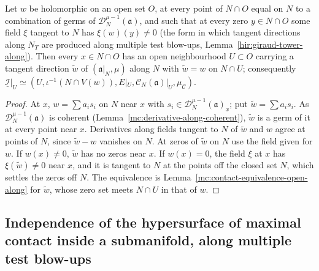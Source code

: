 \begin{lemma}
\label{mc:tangent-direction-along-restricted}
\leanok
Let \(w\) be holomorphic on an open set \(O\), at every point of \(N\cap O\) equal on \(N\) to a combination of germs of \(\mathcal D_N^{\mu-1}(\mathfrak a)\), and such that
at every zero \(y\in N\cap O\) some field \(\xi\) tangent to \(N\) has \(\xi(w)(y)\ne0\) (the form in which tangent directions along \(N_T\) are produced along
multiple test blow-ups, Lemma~\ref{hir:giraud-tower-along}). Then every \(x\in N\cap O\) has an open neighbourhood \(U\subset O\) carrying a tangent direction
\(\tilde w\) of \((\mathfrak a|_N,\mu)\) along \(N\) with \(\tilde w=w\) on \(N\cap U\); consequently
\(\underline{\mathcal I}|_U\simeq(U,\iota^{-1}(N\cap V(w)),E|_U,\mathcal C_N(\mathfrak a)|_U,\mu_{\mathcal C})\).
\end{lemma}
\begin{proof}
\leanok
At \(x\), \(w=\sum a_is_i\) on \(N\) near \(x\) with \(s_i\in\mathcal D_N^{\mu-1}(\mathfrak a)_x\); put \(\tilde w=\sum a_is_i\). As \(\mathcal D_N^{\mu-1}(\mathfrak a)\) is coherent
(Lemma~\ref{mc:derivative-along-coherent}), \(\tilde w\) is a germ of it at every point near \(x\). Derivatives along fields tangent to \(N\) of \(\tilde w\) and \(w\) agree at
points of \(N\), since \(\tilde w-w\) vanishes on \(N\). At zeros of \(\tilde w\) on \(N\) use the field given for \(w\). If \(w(x)\ne0\), \(\tilde w\) has no zeros near \(x\). If
\(w(x)=0\), the field \(\xi\) at \(x\) has \(\xi(\tilde w)\ne0\) near \(x\), and it is tangent to \(N\) at the points off the closed set \(N\), which settles the zeros off \(N\).
The equivalence is Lemma~\ref{mc:contact-equivalence-open-along} for \(\tilde w\), whose zero set meets \(N\cap U\) in that of \(w\).
\end{proof}

\subsection{Independence of the hypersurface of maximal contact inside a submanifold, along multiple test blow-ups}

